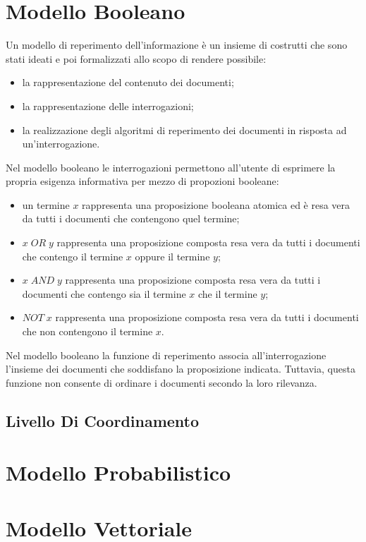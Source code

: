 \documentclass{article}
\begin{document}
\section{Modello Booleano}
Un modello di reperimento dell'informazione è un insieme di costrutti che sono stati ideati e poi formalizzati allo scopo di rendere possibile:
\begin{itemize}
\item la rappresentazione del contenuto dei documenti;
\item la rappresentazione delle interrogazioni;
\item la realizzazione degli algoritmi di reperimento dei documenti in risposta ad un'interrogazione.
\end{itemize}
Nel modello booleano le interrogazioni permettono all'utente di esprimere la propria esigenza informativa per mezzo di propozioni booleane:
\begin{itemize}
\item un termine $x$ rappresenta una proposizione booleana atomica ed è resa vera da tutti i documenti che contengono quel termine;
\item $x\;OR\;y$ rappresenta una proposizione composta resa vera da tutti i documenti che contengo il termine $x$ oppure il termine $y$;
\item $x\;AND\;y$ rappresenta una proposizione composta resa vera da tutti i documenti che contengo sia il termine $x$ che il termine $y$;
\item $NOT\;x$ rappresenta una proposizione composta resa vera da tutti i documenti che non contengono il termine $x$.
\end{itemize}
Nel modello booleano la funzione di reperimento associa all'interrogazione l'insieme dei documenti che soddisfano la proposizione indicata. Tuttavia, questa funzione non consente di ordinare i documenti secondo la loro rilevanza.

\subsection{Livello Di Coordinamento}



\section{Modello Probabilistico}


\section{Modello Vettoriale}
\end{document}
